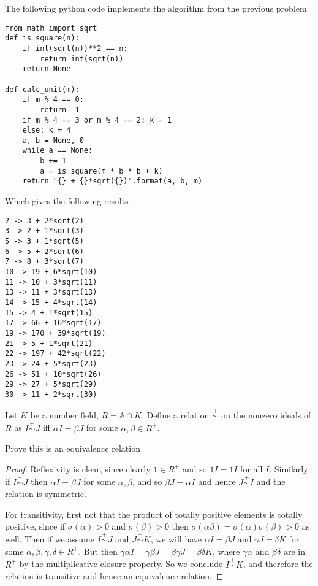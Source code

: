 \documentclass[11pt]{article}
\begin{document}
The following python code implements the algorithm from the previous problem
\begin{verbatim}
from math import sqrt
def is_square(n):
    if int(sqrt(n))**2 == n:
        return int(sqrt(n))
    return None

def calc_unit(m):
    if m % 4 == 0:
        return -1
    if m % 4 == 3 or m % 4 == 2: k = 1
    else: k = 4
    a, b = None, 0
    while a == None:
        b += 1
        a = is_square(m * b * b + k)
    return "{} + {}*sqrt({})".format(a, b, m)
\end{verbatim}
Which gives the following results
\begin{verbatim}
2 -> 3 + 2*sqrt(2)
3 -> 2 + 1*sqrt(3)
5 -> 3 + 1*sqrt(5)
6 -> 5 + 2*sqrt(6)
7 -> 8 + 3*sqrt(7)
10 -> 19 + 6*sqrt(10)
11 -> 10 + 3*sqrt(11)
13 -> 11 + 3*sqrt(13)
14 -> 15 + 4*sqrt(14)
15 -> 4 + 1*sqrt(15)
17 -> 66 + 16*sqrt(17)
19 -> 170 + 39*sqrt(19)
21 -> 5 + 1*sqrt(21)
22 -> 197 + 42*sqrt(22)
23 -> 24 + 5*sqrt(23)
26 -> 51 + 10*sqrt(26)
29 -> 27 + 5*sqrt(29)
30 -> 11 + 2*sqrt(30)
\end{verbatim}


Let $K$ be a number field, $R = \mathbb{A} \cap K$.
Define a relation $\overset{+}{\sim}$ on the nonzero ideals of $R$ as $I \overset{+}{\sim} J$ iff $\alpha I = \beta J$ for some $\alpha, \beta \in R^+$.

Prove this is an equivalence relation
\begin{proof}
  Reflexivity is clear, since clearly $1 \in R^+$ and so $1I = 1I$ for all $I$.
  Similarly if $I \overset{+}{\sim} J$ then $\alpha I = \beta J$ for some $\alpha, \beta$, and so $\beta J = \alpha I$ and hence $J \overset{+}{\sim} I$ and the relation is symmetric.

  For transitivity, first not that the product of totally positive elements is totally positive, since if $\sigma(\alpha) > 0$ and $\sigma(\beta) > 0$ then $\sigma(\alpha\beta) = \sigma(\alpha)\sigma(\beta) > 0$ as well.
  Then if we assume $I \overset{+}{\sim} J$ and $J \overset{+}{\sim} K$, we will have $\alpha I = \beta J$ and $\gamma J = \delta K$ for some $\alpha,\beta,\gamma,\delta \in R^+$.
  But then $\gamma \alpha I = \gamma \beta J = \beta \gamma J = \beta \delta K$, where $\gamma \alpha$ and $\beta \delta$ are in $R^+$ by the multiplicative closure property.
  So we conclude $I \overset{+}{\sim} K$, and therefore the relation is transitive and hence an equivalence relation.
\end{proof}
\end{document}
